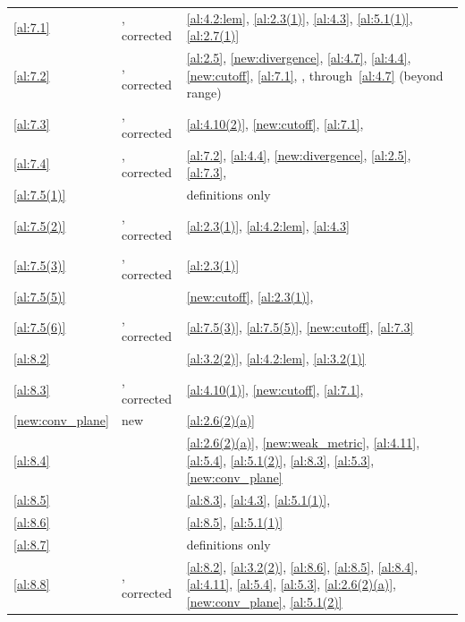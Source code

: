\begin{center}
\begin{longtable}{p{}p{}p{}}
\ref{al:7.1} & \cite[7.1]{Allard1972}, corrected & \ref{al:4.2:lem}, \ref{al:2.3(1)}, \ref{al:4.3}, \ref{al:5.1(1)}, \ref{al:2.7(1)} \\
\ref{al:7.2} & \cite[7.2]{Allard1972}, corrected & \ref{al:2.5}, \ref{new:divergence}, \ref{al:4.7}, \ref{al:4.4}, \ref{new:cutoff}, \ref{al:7.1}, \cite[3.1.13, 3.2.3, 3.2.5, 3.2.19]{Federer1969}, \cite[4.5.6, 4.5.12]{Federer1969} through~\ref{al:4.7} (beyond range) \\
\ref{al:7.3} & \cite[7.3]{Allard1972}, corrected & \ref{al:4.10(2)}, \ref{new:cutoff}, \ref{al:7.1}, \cite[2.4.7, 2.4.15, 2.9.20]{Federer1969} \\
\ref{al:7.4} & \cite[7.4]{Allard1972}, corrected & \ref{al:7.2}, \ref{al:4.4}, \ref{new:divergence}, \ref{al:2.5}, \ref{al:7.3}, \cite[2.4.9, 2.4.14, 3.1.13]{Federer1969} \\
\ref{al:7.5(1)} & \cite[7.5(1)]{Allard1972} & definitions only \\
\ref{al:7.5(2)} & \cite[7.5(2)]{Allard1972}, corrected & \ref{al:2.3(1)}, \ref{al:4.2:lem}, \ref{al:4.3} \\
\ref{al:7.5(3)} & \cite[7.5(3)(4)]{Allard1972}, corrected & \ref{al:2.3(1)} \\
\ref{al:7.5(5)} & \cite[7.5(5)]{Allard1972} & \ref{new:cutoff}, \ref{al:2.3(1)}, \cite[2.4.7]{Federer1969} \\
\ref{al:7.5(6)} & \cite[7.5(6)]{Allard1972}, corrected & \ref{al:7.5(3)}, \ref{al:7.5(5)}, \ref{new:cutoff}, \ref{al:7.3} \\
\ref{al:8.2} & \cite[8.2]{Allard1972} & \ref{al:3.2(2)}, \ref{al:4.2:lem}, \ref{al:3.2(1)} \\
\ref{al:8.3} & \cite[8.3]{Allard1972}, corrected & \ref{al:4.10(1)}, \ref{new:cutoff}, \ref{al:7.1}, \cite[2.9.19]{Federer1969} \\
\ref{new:conv_plane} & new & \ref{al:2.6(2)(a)} \\
\ref{al:8.4} & \cite[8.4]{Allard1972} & \ref{al:2.6(2)(a)}, \ref{new:weak_metric}, \ref{al:4.11}, \ref{al:5.4}, \ref{al:5.1(2)}, \ref{al:8.3}, \ref{al:5.3}, \ref{new:conv_plane} \\
\ref{al:8.5} & \cite[8.5]{Allard1972} & \ref{al:8.3}, \ref{al:4.3}, \ref{al:5.1(1)}, \cite[2.4.14]{Federer1969} \\
\ref{al:8.6} & \cite[8.6]{Allard1972} & \ref{al:8.5}, \ref{al:5.1(1)} \\
\ref{al:8.7} & \cite[8.7]{Allard1972} & definitions only \\
\ref{al:8.8} & \cite[8.8]{Allard1972}, corrected & \ref{al:8.2}, \ref{al:3.2(2)}, \ref{al:8.6}, \ref{al:8.5}, \ref{al:8.4}, \ref{al:4.11}, \ref{al:5.4}, \ref{al:5.3}, \ref{al:2.6(2)(a)}, \ref{new:conv_plane}, \ref{al:5.1(2)} \\

\end{longtable}
\end{center}
